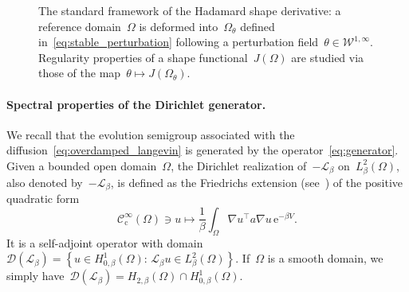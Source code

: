 \documentclass[a4]{article}
\newcommand{\cL}{\mathcal{L}}
\newcommand{\e}{\mathrm{e}}
\newcommand{\1}{\mathbbm 1}
\newcommand{\Winf}{{{\cW}^{1,\infty}}}
\newcommand{\cW}{\mathcal{W}}
\begin{document}
\begin{figure}
            \caption{\label{fig:shape_perturbation} The standard framework of the Hadamard shape derivative: a reference domain~$\Omega$ is deformed into~$\Omega_\theta$ defined in~\eqref{eq:stable_perturbation} following a perturbation field~$\theta\in\Winf$. Regularity properties of a shape functional~$J(\Omega)$ are studied via those of the map~$\theta\mapsto J(\Omega_\theta)$.}
        \end{figure}
        
        \paragraph{Spectral properties of the Dirichlet generator.}
        We recall that the evolution semigroup associated with the diffusion~\eqref{eq:overdamped_langevin} is generated by the operator~\eqref{eq:generator}.
        Given a bounded open domain~$\Omega$, the Dirichlet realization of~$-\cL_\beta$ on~$L^2_\beta(\Omega)$, also denoted by~$-\cL_\beta$, is defined as the Friedrichs extension (see~\cite{T14}) of the positive quadratic form
        \begin{equation}
            \mathcal C_{\mathrm{c}}^\infty(\Omega)\ni u\mapsto \frac1\beta\int_{\Omega}\nabla u^\top a \nabla u\,\e^{-\beta V}.
        \end{equation}
        It is a self-adjoint operator with domain~$\mathcal D(\cL_\beta) = \left\{u\in H_{0,\beta}^1(\Omega):\, \cL_\beta u\in L^2_\beta(\Omega)\right\}$.
       If~$\Omega$ is a smooth domain, we simply have~$\mathcal D(\cL_\beta)=H_{2,\beta}(\Omega)\cap H_{0,\beta}^1(\Omega)$.
\end{document}

